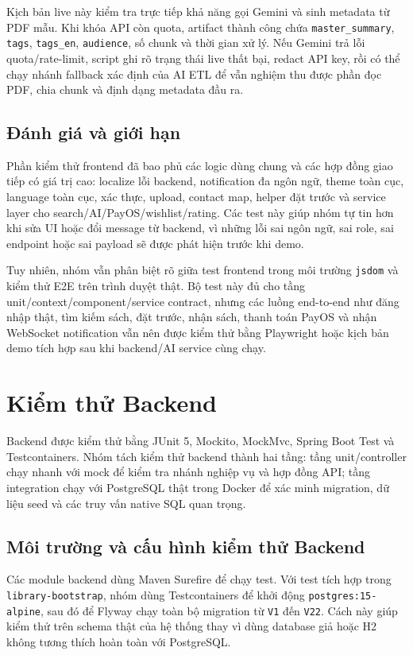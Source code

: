 Kịch bản live này kiểm tra trực tiếp khả năng gọi Gemini và sinh metadata từ PDF
mẫu. Khi khóa API còn quota, artifact thành công chứa
\texttt{master\_summary}, \texttt{tags}, \texttt{tags\_en}, \texttt{audience},
số chunk và thời gian xử lý. Nếu Gemini trả lỗi quota/rate-limit, script ghi rõ
trạng thái live thất bại, redact API key, rồi có thể chạy nhánh fallback xác
định của AI ETL để vẫn nghiệm thu được phần đọc PDF, chia chunk và định dạng
metadata đầu ra.

\subsection{Đánh giá và giới hạn}

Phần kiểm thử frontend đã bao phủ các logic dùng chung và các hợp đồng
giao tiếp có giá trị cao: localize lỗi backend, notification đa ngôn ngữ, theme
toàn cục, language toàn cục, xác thực, upload, contact map, helper đặt trước và
service layer cho search/AI/PayOS/wishlist/rating. Các test này giúp nhóm tự
tin hơn khi sửa UI hoặc đổi message từ backend, vì những lỗi sai ngôn ngữ, sai
role, sai endpoint hoặc sai payload sẽ được phát hiện trước khi demo.

Tuy nhiên, nhóm vẫn phân biệt rõ giữa test frontend trong môi trường
\texttt{jsdom} và kiểm thử E2E trên trình duyệt thật. Bộ test này đủ cho
tầng unit/context/component/service contract, nhưng các luồng end-to-end như
đăng nhập thật, tìm kiếm sách, đặt trước, nhận sách, thanh toán PayOS và nhận
WebSocket notification vẫn nên được kiểm thử bằng Playwright hoặc kịch bản demo
tích hợp sau khi backend/AI service cùng chạy.

\section{Kiểm thử Backend}

Backend được kiểm thử bằng JUnit 5, Mockito, MockMvc, Spring Boot Test và
Testcontainers. Nhóm tách kiểm thử backend thành hai tầng: tầng unit/controller
chạy nhanh với mock để kiểm tra nhánh nghiệp vụ và hợp đồng API; tầng
integration chạy với PostgreSQL thật trong Docker để xác minh migration, dữ
liệu seed và các truy vấn native SQL quan trọng.

\subsection{Môi trường và cấu hình kiểm thử Backend}

Các module backend dùng Maven Surefire để chạy test. Với test tích hợp trong
\texttt{library-bootstrap}, nhóm dùng Testcontainers để khởi động
\texttt{postgres:15-alpine}, sau đó để Flyway chạy toàn bộ migration từ
\texttt{V1} đến \texttt{V22}. Cách này giúp kiểm thử trên schema thật của hệ
thống thay vì dùng database giả hoặc H2 không tương thích hoàn toàn với
PostgreSQL.

